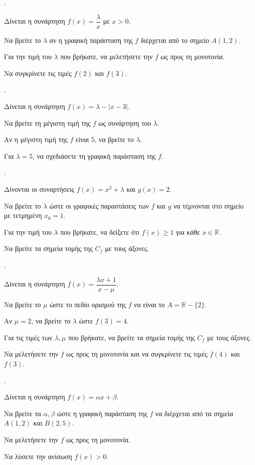 \documentclass[11pt,a4paper,twocolumn]{article}
\newcounter{askhsh}
\newcommand{\askhsh}{\large\theaskhsh.\ \addtocounter{askhsh}{1}}
\begin{document}
\askhsh Δίνεται η συνάρτηση $f(x)=\dfrac{\lambda}{x}$ με $x>0$.
\begin{alist}
    \item Να βρείτε το $\lambda$ αν η γραφική παράσταση της $f$ διέρχεται από το σημείο $A(1,2)$.
    \item Για την τιμή του $\lambda$ που βρήκατε, να μελετήσετε την $f$ ως προς τη μονοτονία.
    \item Να συγκρίνετε τις τιμές $f(2)$ και $f(3)$.
\end{alist}



\askhsh Δίνεται η συνάρτηση $f(x)=\lambda-|x-3|$.
\begin{alist}
    \item Να βρείτε τη μέγιστη τιμή της $f$ ως συνάρτηση του $\lambda$.
    \item Αν η μέγιστη τιμή της $f$ είναι $5$, να βρείτε το $\lambda$.
    \item Για $\lambda=5$, να σχεδιάσετε τη γραφική παράσταση της $f$.
\end{alist}

\askhsh Δίνονται οι συναρτήσεις $f(x)=x^2+\lambda$ και $g(x)=2$.
\begin{alist}
    \item Να βρείτε το $\lambda$ ώστε οι γραφικές παραστάσεις των $f$ και $g$ να τέμνονται στο σημείο με τετμημένη $x_0=1$.
    \item Για την τιμή του $\lambda$ που βρήκατε, να δείξετε ότι $f(x)\ge 1$ για κάθε $x\in\mathbb{R}$.
    \item Να βρείτε τα σημεία τομής της $C_f$ με τους άξονες.
\end{alist}



\askhsh Δίνεται η συνάρτηση $f(x)=\dfrac{\lambda x+1}{x-\mu}$.
\begin{alist}
    \item Να βρείτε το $\mu$ ώστε το πεδίο ορισμού της $f$ να είναι το $A=\mathbb{R}-\{2\}$.
    \item Αν $\mu=2$, να βρείτε το $\lambda$ ώστε $f(3)=4$.
    \item Για τις τιμές των $\lambda,\mu$ που βρήκατε, να βρείτε τα σημεία τομής της $C_f$ με τους άξονες.
    \item Να μελετήσετε την $f$ ως προς τη μονοτονία και να συγκρίνετε τις τιμές $f(4)$ και $f(3)$.
\end{alist}

\askhsh Δίνεται η συνάρτηση $f(x)=\alpha x+\beta$.
\begin{alist}
    \item Να βρείτε τα $\alpha,\beta$ ώστε η γραφική παράσταση της $f$ να διέρχεται από τα σημεία $A(1,2)$ και $B(2,5)$.
    \item Να μελετήσετε την $f$ ως προς τη μονοτονία.
    \item Να λύσετε την ανίσωση $f(x)>0$.
\end{alist}
\end{document}
